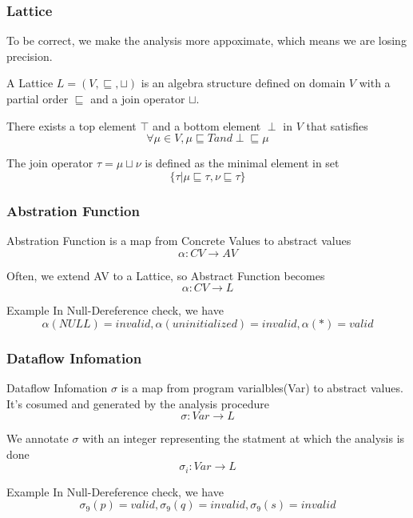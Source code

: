 \documentclass[]{beamer}
\begin{document}
\begin{frame}
  \frametitle{Lattice}
  To be correct, we make the analysis more appoximate, which means we are losing precision.

  \vspace{1em}\pause
  A \alert{Lattice} $L=(V, \sqsubseteq, \sqcup)$ is an algebra structure defined on domain $V$ with a
  \alert{partial order} $\sqsubseteq$ and a \alert{join operator} $\sqcup$.

  \vspace{1em}\pause
  There exists a \alert{top} element $\top$ and a \alert{bottom} element $\perp$ in $V$ that satisfies
  $$\forall \mu \in V, \mu \sqsubseteq T and \perp \sqsubseteq \mu$$

  \vspace{1em}\pause
  The join operator $\tau = \mu \sqcup \nu$ is defined as the minimal element in set
  $$\{\tau | \mu \sqsubseteq \tau, \nu \sqsubseteq \tau\}$$
\end{frame}

\begin{frame}
  \frametitle{Abstration Function}
  \alert{Abstration Function} is a map from Concrete Values to abstract values
  $$\alpha : CV \rightarrow AV$$

  \vspace{1em}\pause
  Often, we extend AV to a Lattice, so Abstract Function becomes
  $$\alpha : CV \rightarrow L$$

  \pause
  \begin{block}{Example}
    In Null-Dereference check, we have
    $$\alpha(NULL) = invalid, \alpha(uninitialized) = invalid,
    \alpha(*)=valid$$
  \end{block}
\end{frame}

\begin{frame}
  \frametitle{Dataflow Infomation}
  \alert{Dataflow Infomation} $\sigma$ is a map from program varialbles(Var) to abstract values.
  It's cosumed and generated by the analysis procedure
  $$\sigma : Var \rightarrow L$$

  \vspace{1em}\pause
  We annotate $\sigma$ with an integer representing the statment at which the analysis is done
  $$\sigma_i : Var \rightarrow L$$

  \pause
  \begin{block}{Example}
    In Null-Dereference check, we have
    $$\sigma_9(p) = valid, \sigma_9(q) = invalid,
    \sigma_9(s)=invalid$$
  \end{block}
\end{frame}
\end{document}
